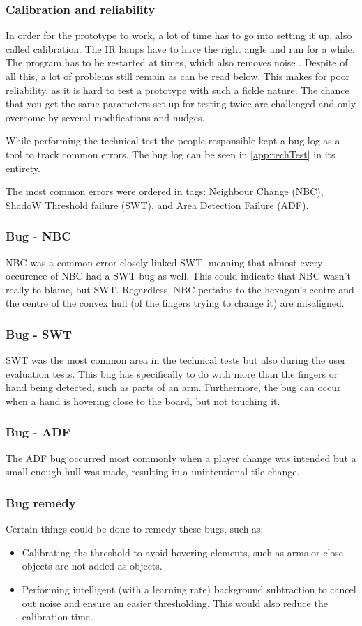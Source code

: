 \subsubsection*{Calibration and reliability}
In order for the prototype to work, a lot of time has to go into setting it up, also called calibration. The IR lamps have to have the right angle and run for a while. The program has to be restarted at times, which also removes noise . Despite of all this, a lot of problems still remain as can be read below. This makes for poor reliability, as it is hard to test a prototype with such a fickle nature. The chance that you get the same parameters set up for testing twice are challenged and only overcome by several modifications and nudges.

While performing the technical test the people responsible kept a bug log as a tool to track common errors. The bug log can be seen in \ref{app:techTest}  in its entirety.

The most common errors were ordered in tags: Neighbour Change (NBC), ShadoW Threshold failure (SWT), and Area Detection Failure (ADF). 
\subsubsection*{Bug - NBC} 
NBC was a common error closely linked SWT, meaning that almost every occurence of NBC had a SWT bug as well. This could indicate that NBC wasn't really to blame, but SWT. Regardless, NBC pertains to the hexagon's centre and the centre of the convex hull (of the fingers trying to change it) are misaligned.
\subsubsection*{Bug - SWT} 
SWT was the most common area in the technical tests but also during the user evaluation tests. This bug has specifically to do with more than the fingers or hand being detected, such as parts of an arm. Furthermore, the bug can occur when a hand is hovering close to the board, but not touching it.
\subsubsection*{Bug - ADF} 
The ADF bug occurred most commonly when a player change was intended but a small-enough hull was made, resulting in a unintentional tile change.
\subsubsection*{Bug remedy}
Certain things could be done to remedy these bugs, such as:
\begin{itemize}
	\item Calibrating the threshold to avoid hovering elements, such as arms or close objects are not added as objects.
	\item Performing intelligent (with a learning rate) background subtraction to cancel out noise and ensure an easier thresholding. This would also reduce the calibration time.
\end{itemize}

